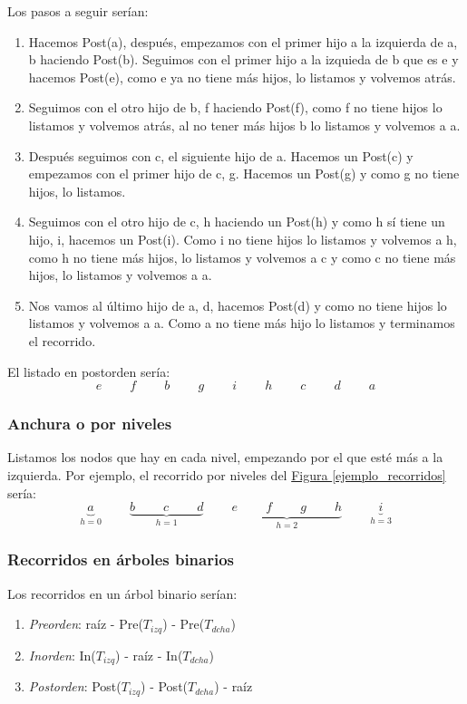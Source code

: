 \documentclass[10pt,a4paper,spanish]{report}
\begin{document}
\noindent
Los pasos a seguir serían:
\begin{enumerate}[1.]
\item Hacemos Post(a), después, empezamos con el primer hijo a la izquierda de a, b haciendo Post(b). Seguimos con el primer hijo a la izquieda de b que es e y hacemos Post(e), como e ya no tiene más hijos, lo listamos y volvemos atrás.
\item Seguimos con el otro hijo de b, f haciendo Post(f), como f no tiene hijos lo listamos y volvemos atrás, al no tener más hijos b lo listamos y volvemos a a.
\item Después seguimos con c, el siguiente hijo de a. Hacemos un Post(c) y empezamos con el primer hijo de c, g. Hacemos un Post(g) y como g no tiene hijos, lo listamos.
\item Seguimos con el otro hijo de c, h haciendo un Post(h) y como h sí tiene un hijo, i, hacemos un Post(i). Como i no tiene hijos lo listamos y volvemos a h, como h no tiene más hijos, lo listamos y volvemos a c y como c no tiene más hijos, lo listamos y volvemos a a.
\item Nos vamos al último hijo de a, d, hacemos Post(d) y como no tiene hijos lo listamos y volvemos a a. Como a no tiene más hijo lo listamos y terminamos el recorrido.
\end{enumerate}

\noindent
El listado en postorden sería:
\begin{displaymath}
e \qquad\ f \qquad\ b \qquad\ g \qquad\ i \qquad\ h \qquad\ c \qquad\ d \qquad\ a
\end{displaymath}

\subsubsection{\textcolor[rgb]{0.3,0.4,0.8}Anchura o por niveles}
\noindent
Listamos los nodos que hay en cada nivel, empezando por el que esté más a la izquierda. Por ejemplo, el recorrido por niveles del \hyperref[ejemplo_recorridos]{Figura \ref*{ejemplo_recorridos}} sería:
\begin{displaymath}
\underbrace{a}_{h=0} \qquad\ \underbrace{b \qquad\ c \qquad\ d}_{h=1} \qquad\ \underbrace{e \qquad\ f \qquad\ g \qquad\ h}_{h=2} \qquad\ \underbrace{i}_{h=3}
\end{displaymath}

\subsubsection{\textcolor[rgb]{0.3,0.4,0.8}Recorridos en árboles binarios}
\noindent
Los recorridos en un árbol binario serían:
\begin{enumerate}[$\spadesuit$]
\item \textit{\textcolor[rgb]{0.3,0.4,0.8}{Preorden}}: raíz - Pre($T_{izq}$) - Pre($T_{dcha}$)
\item \textit{\textcolor[rgb]{0.3,0.4,0.8}{Inorden}}: In($T_{izq}$) - raíz - In($T_{dcha}$)
\item \textit{\textcolor[rgb]{0.3,0.4,0.8}{Postorden}}: Post($T_{izq}$) - Post($T_{dcha}$) - raíz
\end{enumerate}
\end{document}
